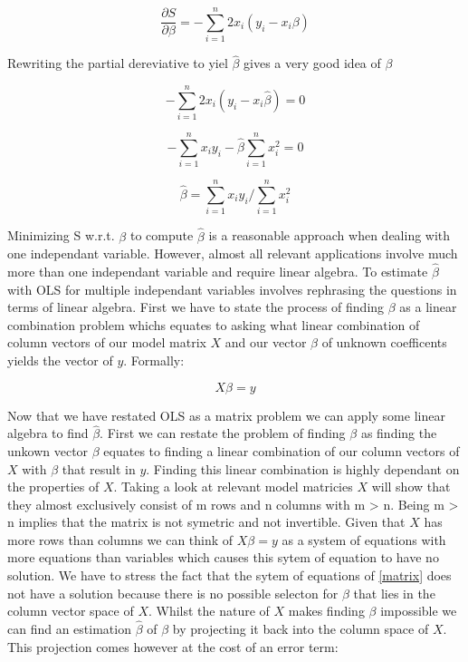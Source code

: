 \documentclass{article}
\begin{document}
    \begin{equation} \label{partialDer} \frac{\partial S}{\partial \beta} = - \sum_{i=1}^{n} 2x_i(y_i-x_i\beta) \end{equation}

    Rewriting the partial dereviative to yiel $\widehat{\beta}$ gives a very good idea of $\beta$

    \begin{equation}  - \sum_{i=1}^{n} 2x_i(y_i-x_i\widehat{\beta}) = 0  \end{equation}

    \begin{equation} - \sum_{i=1}^{n} x_iy_i-\widehat{\beta} \sum_{i=1}^{n} x_i^2 = 0  \end{equation}

    \begin{equation} \widehat{\beta} = \sum_{i=1}^{n} x_iy_i /\sum_{i=1}^{n} x_i^2 \end{equation}


    Minimizing S w.r.t. $\beta$ to compute $\widehat{\beta}$ is a reasonable approach when dealing with one independant variable. However, almost all relevant applications involve much more than one independant variable and require linear algebra. To estimate $\widehat{\beta}$ with OLS for multiple independant variables involves rephrasing the questions in terms of linear algebra. First we have to state the process of finding $\beta$ as a linear combination problem whichs equates to asking what linear combination of column vectors of our model matrix $X$ and our vector $\beta$ of unknown coefficents yields the vector of $y$. Formally:

    \begin{equation} \label{matrix} X\beta = y \end{equation}

    Now that we have restated OLS as a matrix problem we can apply some linear algebra to find $\widehat{\beta}$. First we can restate the problem of finding $\beta$ as finding the unkown vector $\beta$ equates to finding a linear combination of our column vectors of $X$ with $\beta$ that result in $y$. Finding this linear combination is highly dependant on the properties of $X$. Taking a look at relevant model matricies $X$ will show that they almost exclusively consist of m rows and n columns with m > n. Being m > n implies that the matrix is not symetric and not invertible. Given that $X$ has more rows than columns we can think of $X\beta = y$ as a system of equations with more equations than variables which causes this sytem of equation to have no solution. We have to stress the fact that the sytem of equations of \ref{matrix} does not have a solution because there is no possible selecton for $\beta$ that lies in the column vector space of $X$. Whilst the nature of $X$ makes finding $\beta$ impossible we can find an estimation $\widehat{\beta}$ of $\beta$ by projecting it back into the column space of $X$. This projection comes however at the cost of an error term:
\end{document}
